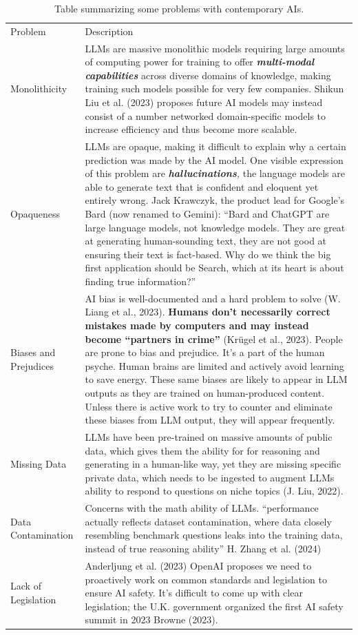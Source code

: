 \documentclass[
  letterpaper,
  DIV=11,
  numbers=noendperiod]{scrartcl}
\begin{document}
\begin{longtable}[]{@{}
  >{\raggedright\arraybackslash}p{}
  >{\raggedright\arraybackslash}p{}@{}}
\caption{Table summarizing some problems with contemporary
AIs.}\tabularnewline
\toprule\noalign{}
\endfirsthead
\endhead
\bottomrule\noalign{}
\endlastfoot
Problem & Description \\
Monolithicity & LLMs are massive monolithic models requiring large
amounts of computing power for training to offer
\textbf{\emph{multi-modal}} \textbf{\emph{capabilities}} across diverse
domains of knowledge, making training such models possible for very few
companies. Shikun Liu et al. (2023) proposes future AI models may
instead consist of a number networked domain-specific models to increase
efficiency and thus become more scalable. \\
Opaqueness & LLMs are opaque, making it difficult to explain why a
certain prediction was made by the AI model. One visible expression of
this problem are \emph{\textbf{hallucinations},} the language models are
able to generate text that is confident and eloquent yet entirely wrong.
Jack Krawczyk, the product lead for Google's Bard (now renamed to
Gemini): ``Bard and ChatGPT are large language models, not knowledge
models. They are great at generating human-sounding text, they are not
good at ensuring their text is fact-based. Why do we think the big first
application should be Search, which at its heart is about finding true
information?'' \\
Biases and Prejudices & AI bias is well-documented and a hard problem to
solve (W. Liang et al., 2023). \textbf{Humans don't necessarily correct
mistakes made by computers and may instead become ``partners in crime''}
(Krügel et al., 2023). People are prone to bias and prejudice. It's a
part of the human psyche. Human brains are limited and actively avoid
learning to save energy. These same biases are likely to appear in LLM
outputs as they are trained on human-produced content. Unless there is
active work to try to counter and eliminate these biases from LLM
output, they will appear frequently. \\
Missing Data & LLMs have been pre-trained on massive amounts of public
data, which gives them the ability for for reasoning and generating in a
human-like way, yet they are missing specific private data, which needs
to be ingested to augment LLMs ability to respond to questions on niche
topics (J. Liu, 2022). \\
Data Contamination & Concerns with the math ability of LLMs.
``performance actually reflects dataset contamination, where data
closely resembling benchmark questions leaks into the training data,
instead of true reasoning ability'' H. Zhang et al. (2024) \\
Lack of Legislation & Anderljung et al. (2023) OpenAI proposes we need
to proactively work on common standards and legislation to ensure AI
safety. It's difficult to come up with clear legislation; the U.K.
government organized the first AI safety summit in 2023 Browne
(2023). \\
\end{longtable}
\end{document}
